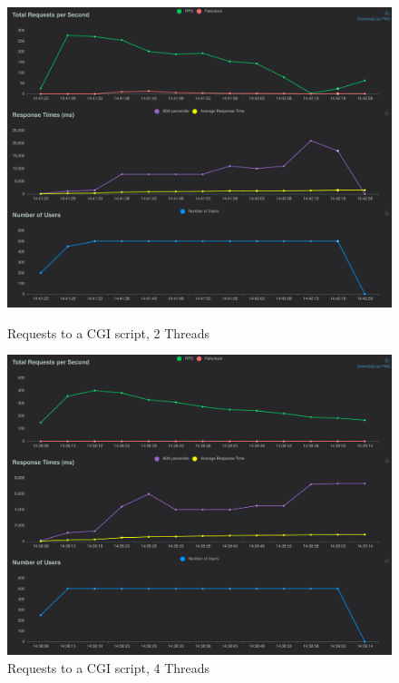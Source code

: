 \begin{figure}[h]
    \centering
    \begin{minipage}{0.45\textwidth}
        \centering
        \includegraphics[width=\textwidth]{figures/cgi_2threads.png}
        \caption{Requests to a CGI script, 2 Threads}
    \end{minipage}
    \hfill
    \begin{minipage}{0.45\textwidth}
        \centering
        \includegraphics[width=\textwidth]{figures/cgi_4threads.png}
        \caption{Requests to a CGI script, 4 Threads}
    \end{minipage}
\end{figure}
